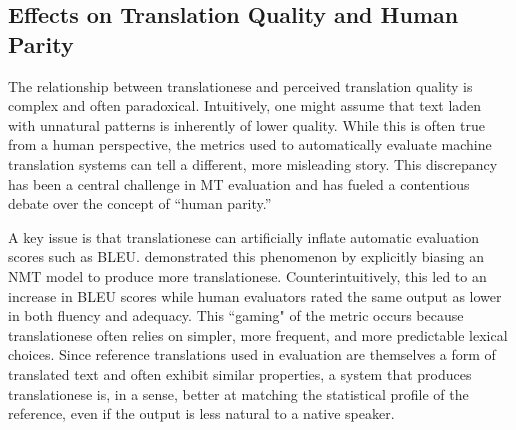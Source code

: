 \documentclass[11pt,a4paper]{article}
\begin{document}
\subsection{Effects on Translation Quality and Human Parity}

The relationship between translationese and perceived translation quality is complex and often paradoxical. Intuitively, one might assume that text laden with unnatural patterns is inherently of lower quality. While this is often true from a human perspective, the metrics used to automatically evaluate machine translation systems can tell a different, more misleading story. This discrepancy has been a central challenge in MT evaluation and has fueled a contentious debate over the concept of ``human parity.''

A key issue is that translationese can artificially inflate automatic evaluation scores such as BLEU. \citet{riley2020translationese} demonstrated this phenomenon by explicitly biasing an NMT model to produce more translationese. Counterintuitively, this led to an increase in BLEU scores while human evaluators rated the same output as lower in both fluency and adequacy. This ``gaming" of the metric occurs because translationese often relies on simpler, more frequent, and more predictable lexical choices. Since reference translations used in evaluation are themselves a form of translated text and often exhibit similar properties, a system that produces translationese is, in a sense, better at matching the statistical profile of the reference, even if the output is less natural to a native speaker.
\end{document}
